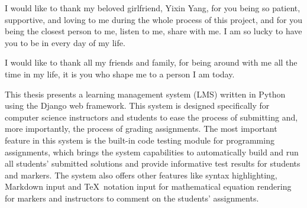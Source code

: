 \medskip

I would like to thank my beloved girlfriend, Yixin Yang,
for you being so patient, supportive, and loving to me during the whole process
of this project, 
and for you being the closest person to me, listen to me, share with me.
I am so lucky to have you to be in every day of my life.

\medskip

I would like to thank all my friends and family, for being around with me all
the time in my life, it is you who shape me to a person
I am today.



\tocAndSuch



This thesis presents a learning management system (LMS) written in Python using
the Django web framework. This system is designed specifically for computer
science instructors and students to ease the process of submitting and,
more importantly, the process of grading assignments. 
The most important feature in this system is the built-in code
testing module for programming assignments, which brings the system capabilities
to automatically build and run all students'
submitted solutions and provide informative test results for students and
markers.
The system also offers other features like syntax highlighting, Markdown input
and \TeX\ notation input for mathematical equation rendering for
markers and instructors to comment on the students' assignments.



\afterpreface
